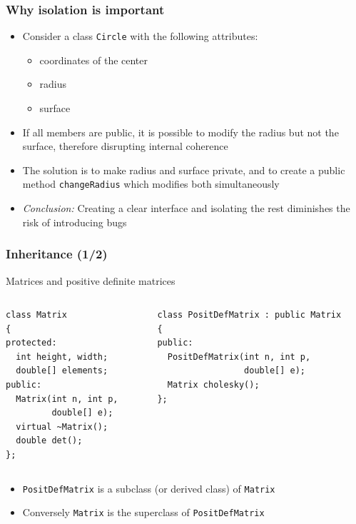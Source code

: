 \documentclass{beamer}
\begin{document}
\begin{frame}
  \frametitle{Why isolation is important}
  \begin{itemize}
  \item Consider a class \texttt{Circle} with the following attributes:
    \begin{itemize}
    \item coordinates of the center
    \item radius
    \item surface
    \end{itemize}
  \item If all members are public, it is possible to modify the radius but not the surface, therefore disrupting internal coherence
  \item The solution is to make radius and surface private, and to create a public method \texttt{changeRadius} which modifies both simultaneously
  \item \textit{Conclusion:} Creating a clear interface and isolating the rest diminishes the risk of introducing bugs
  \end{itemize}
\end{frame}

\begin{frame}[fragile]
  \frametitle{Inheritance (1/2)}

  \begin{block}{Matrices and positive definite matrices}
    \begin{scriptsize}
      \begin{columns}[t]
        \begin{column}{4.8cm}
\begin{verbatim}
class Matrix
{
protected:
  int height, width;
  double[] elements;
public:
  Matrix(int n, int p,
         double[] e);
  virtual ~Matrix();
  double det();
};
\end{verbatim}
        \end{column}
        \begin{column}{6cm}
\begin{verbatim}
class PositDefMatrix : public Matrix
{
public:
  PositDefMatrix(int n, int p,
                 double[] e);
  Matrix cholesky();
};
\end{verbatim}
        \end{column}
      \end{columns}
    \end{scriptsize}
    
  \end{block}
  \begin{itemize}
  \item \texttt{PositDefMatrix} is a \alert{subclass} (or \alert{derived class}) of \texttt{Matrix}
  \item Conversely \texttt{Matrix} is the \alert{superclass} of \texttt{PositDefMatrix}
  \end{itemize}
\end{frame}
\end{document}
